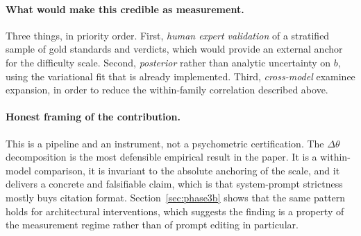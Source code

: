 \paragraph{What would make this credible as measurement.}
Three things, in priority order. First, \emph{human expert validation} of
a stratified sample of gold standards and verdicts, which would provide
an external anchor for the difficulty scale. Second, \emph{posterior}
rather than analytic uncertainty on $b$, using the variational fit that
is already implemented. Third, \emph{cross-model} examinee expansion, in
order to reduce the within-family correlation described above.

\paragraph{Honest framing of the contribution.}
This is a pipeline and an instrument, not a psychometric certification.
The $\Delta\theta$ decomposition is the most defensible empirical result
in the paper. It is a within-model comparison, it is invariant to the
absolute anchoring of the scale, and it delivers a concrete and
falsifiable claim, which is that system-prompt strictness mostly buys
citation format. Section~\ref{sec:phase3b} shows that the same pattern
holds for architectural interventions, which suggests the finding is a
property of the measurement regime rather than of prompt editing in
particular.
